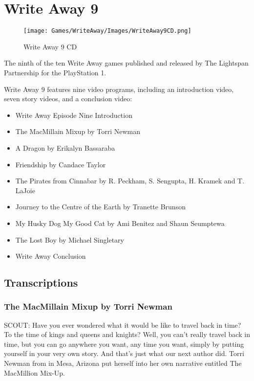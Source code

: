 \chapter{Write Away 9}

\begin{figure}[H]
    \centering
    \texttt{[image: Games/WriteAway/Images/WriteAway9CD.png]}
    \caption{Write Away 9 CD}
\end{figure}

The ninth of the ten Write Away games published and released by The Lightspan Partnership for the PlayStation 1.

Write Away 9 features nine video programs, including an introduction video, seven story videos, and a conclusion video:

\begin{itemize}
    \item Write Away Episode Nine Introduction
    \item The MacMillain Mixup by Torri Newman
    \item A Dragon by Erikalyn Bassaraba
    \item Friendship by Candace Taylor
    \item The Pirates from Cinnabar by R.
          Peckham, S.
          Sengupta, H.
          Kramek and T.
          LaJoie
    \item Journey to the Centre of the Earth by Tranette Brunson
    \item My Husky Dog My Good Cat by Ami Benitez and Shaun Seumptewa
    \item The Lost Boy by Michael Singletary
    \item Write Away Conclusion
\end{itemize}

\clearpage
\newpage

\section{Transcriptions}

\subsection{The MacMillain Mixup by Torri Newman}

SCOUT:
Have you ever wondered what it would be like to travel back in time?
To the time of kings and queens and knights?
Well, you can't really travel back in time, but you can go anywhere you want, any time you want, simply by putting yourself in your very own story.
And that's just what our next author did.
Torri Newman from in Mesa, Arizona put herself into her own narrative entitled The MacMillion Mix-Up.

